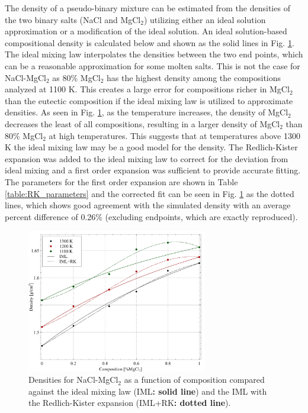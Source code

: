 \documentclass[review]{elsarticle}
\providecommand{\DIFaddtex}[1]{{\bf #1}} %
\providecommand{\DIFaddFL}[1]{\DIFadd{#1}} %
\providecommand{\DIFaddbeginFL}{} %
\providecommand{\DIFaddendFL}{} %
\providecommand{\DIFdelbeginFL}{} %
\providecommand{\DIFdelendFL}{} %
\providecommand{\DIFadd}[1]{\texorpdfstring{\DIFaddtex{#1}}{#1}} %
\newcommand{\DIFscaledelfig}{0.5}
\newlength{\DIFdelgraphicswidth} %
\newlength{\DIFdelgraphicsheight} %
\newcommand{\DIFaddincludegraphics}[2][]{{\color{blue}\fbox{\DIFOincludegraphics[#1]{#2}}}} %
\newcommand{\DIFdelincludegraphics}[2][]{%
\sbox{\DIFdelgraphicsbox}{\DIFOincludegraphics[#1]{#2}}%
\settoboxwidth{\DIFdelgraphicswidth}{\DIFdelgraphicsbox} %
\settoboxtotalheight{\DIFdelgraphicsheight}{\DIFdelgraphicsbox} %
\scalebox{\DIFscaledelfig}{%
\parbox[b]{\DIFdelgraphicswidth}{\usebox{\DIFdelgraphicsbox}\\[-\baselineskip] \rule{\DIFdelgraphicswidth}{0em}}\llap{\resizebox{\DIFdelgraphicswidth}{\DIFdelgraphicsheight}{%
\setlength{\unitlength}{\DIFdelgraphicswidth}%
\begin{picture}(1,1)%
\thicklines\linethickness{2pt} %
{\color[rgb]{1,0,0}\put(0,0){\framebox(1,1){}}}%
{\color[rgb]{1,0,0}\put(0,0){\line( 1,1){1}}}%
{\color[rgb]{1,0,0}\put(0,1){\line(1,-1){1}}}%
\end{picture}%
}\hspace*{3pt}}} %
} %
\DeclareRobustCommand{\DIFaddbeginFL}{\DIFOaddbeginFL \let\includegraphics\DIFaddincludegraphics} %
\DeclareRobustCommand{\DIFaddendFL}{\DIFOaddendFL \let\includegraphics\DIFOincludegraphics} %
\DeclareRobustCommand{\DIFdelbeginFL}{\DIFOdelbeginFL \let\includegraphics\DIFdelincludegraphics} %
\DeclareRobustCommand{\DIFdelendFL}{\DIFOaddendFL \let\includegraphics\DIFOincludegraphics} %
\begin{document}
The density of a pseudo-binary mixture can be estimated from the densities of the two binary salts (NaCl and MgCl$_2$) utilizing either an ideal solution approximation or a modification of the ideal solution. An ideal solution-based compositional density is calculated below and shown as the solid lines in Fig. \ref{fig:density_mixing}. The ideal mixing law interpolates the densities between the two end points, which can be a reasonable approximation for some molten salts. This is not the case for NaCl-MgCl$_2$ as 80\% MgCl$_2$ has the highest density among the compositions analyzed at 1100 K. This creates a large error for compositions richer in MgCl$_2$ than the eutectic composition if the ideal mixing law is utilized to approximate densities. As seen in Fig. \ref{fig:density_mixing}, as the temperature increases, the density of MgCl$_2$ decreases the least of all compositions, resulting in a larger density of MgCl$_2$ than 80\% MgCl$_2$ at high temperatures. This suggests that at temperatures above 1300 K the ideal mixing law may be a good model for the density. The Redlich-Kister expansion was added to the ideal mixing law to correct for the deviation from ideal mixing and a first order expansion was sufficient to provide accurate fitting. The parameters for the first order expansion are shown in Table \ref{table:RK_parameters} and the corrected fit can be seen in Fig. \ref{fig:density_mixing} as the dotted lines, which shows good agreement with the simulated density with an average percent difference of 0.26\% (excluding endpoints, which are exactly reproduced). 

\begin{figure}[h]
 \centering
 \DIFdelbeginFL %
\DIFdelendFL \DIFaddbeginFL \includegraphics[width=0.7\textwidth]{density_mixing.jpg} 
 \DIFaddendFL \caption{Densities for NaCl-MgCl$_2$ as a function of composition compared against the ideal mixing law (IML\DIFaddbeginFL \DIFaddFL{: solid line}\DIFaddendFL ) and the IML with the Redlich-Kister expansion (IML+RK\DIFaddbeginFL \DIFaddFL{: dotted line}\DIFaddendFL ).}
 \label{fig:density_mixing}
\end{figure} 
\end{document}
